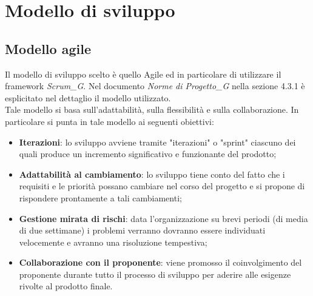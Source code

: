 \section{Modello di sviluppo}
\subsection{Modello agile}
Il modello di sviluppo scelto è quello Agile ed in particolare di utilizzare il framework \emph{\textit{Scrum_G}}. Nel documento \emph{\textit{Norme di Progetto_G}} nella sezione 4.3.1 è esplicitato nel dettaglio il modello utilizzato.\\ 
Tale modello si basa sull'adattabilità, sulla flessibilità e sulla collaborazione.
In particolare si punta in tale modello ai seguenti obiettivi:
\begin{itemize}
    \item \textbf{Iterazioni}: lo sviluppo avviene tramite "iterazioni" o "sprint" ciascuno dei quali produce un incremento significativo e funzionante del prodotto;
    \item \textbf{Adattabilità al cambiamento}: lo sviluppo tiene conto del fatto che i requisiti e le priorità possano cambiare nel corso del progetto e si propone di rispondere prontamente a tali cambiamenti;
    \item \textbf{Gestione mirata di rischi}: data l'organizzazione su brevi periodi (di media di due settimane) i problemi verranno dovranno essere individuati velocemente e avranno una risoluzione tempestiva;
    \item \textbf{Collaborazione con il proponente}: viene promosso il coinvolgimento del proponente durante tutto il processo di sviluppo per aderire alle esigenze rivolte al prodotto finale.
\end{itemize}